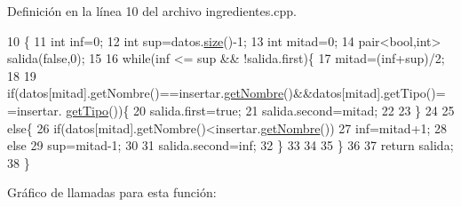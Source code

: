 Definición en la línea 10 del archivo ingredientes.\+cpp.


\begin{DoxyCode}
10                                                                       \{
11     \textcolor{keywordtype}{int} inf=0;
12     \textcolor{keywordtype}{int} sup=datos.\hyperlink{classVD_a411ad026db1c8e0617d9031f1f1017a5}{size}()-1;
13     \textcolor{keywordtype}{int} mitad=0;
14     pair<bool,int> salida(\textcolor{keyword}{false},0);
15     
16     \textcolor{keywordflow}{while}(inf <= sup && !salida.first)\{
17         mitad=(inf+sup)/2;
18         
19         \textcolor{keywordflow}{if}(datos[mitad].getNombre()==insertar.\hyperlink{classingrediente_a8da227d03af8811627434703922b463a}{getNombre}()&&datos[mitad].getTipo()==insertar.
      \hyperlink{classingrediente_a03334e887add1dbdc7991de77234ede7}{getTipo}())\{
20             salida.first=\textcolor{keyword}{true};
21             salida.second=mitad;
22             
23         \}
24         
25         \textcolor{keywordflow}{else}\{
26             \textcolor{keywordflow}{if}(datos[mitad].getNombre()<insertar.\hyperlink{classingrediente_a8da227d03af8811627434703922b463a}{getNombre}())
27                 inf=mitad+1;
28             \textcolor{keywordflow}{else}
29                 sup=mitad-1;
30 
31             salida.second=inf;
32         \}
33 
34         
35     \}
36 
37     \textcolor{keywordflow}{return} salida;
38 \}
\end{DoxyCode}
Gráfico de llamadas para esta función\+:
